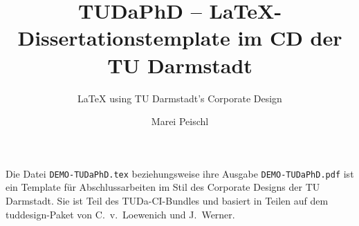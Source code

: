 \documentclass[
	ngerman,
	ruledheaders=chapter,%
	class=book,%
	thesis={
		type=dr,
		dr=rernat
	},
	accentcolor=9c,%
	custommargins=true,%
	marginpar=false,%
	fontsize=11pt,%
]{tudapub}
\let\file\texttt
\begin{document}


\frontmatter

\title{TUDaPhD -- \LaTeX-Dissertationstemplate im CD der TU Darmstadt}
\subtitle{\LaTeX{} using TU Darmstadt's Corporate Design}
\author[M. Peischl]{Marei Peischl}%



\submissiondate{\today}
\examdate{\today}


\dedication{For \TeX{} \& Friends}

\maketitle

\affidavit

Die Datei \file{DEMO-TUDaPhD.tex} beziehungsweise ihre Ausgabe \file{DEMO-TUDaPhD.pdf} ist ein Template für Abschlussarbeiten im Stil des Corporate Designs der TU Darmstadt.
Sie ist Teil des TUDa-CI-Bundles und basiert in Teilen auf dem tuddesign-Paket von C.~v.~Loewenich und J.~Werner.
\end{document}
